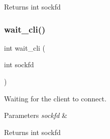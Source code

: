 \begin{DoxyReturn}{Returns}
int sockfd 
\end{DoxyReturn}
\mbox{\label{socket_8h_aa1bc7f68e6545e809e6b75b737fcbbe3}} 
\subsubsection{wait\+\_\+cli()}
{\footnotesize\ttfamily int wait\+\_\+cli (\begin{DoxyParamCaption}\item[{int}]{sockfd }\end{DoxyParamCaption})}



Waiting for the client to connect. 


\begin{DoxyParams}{Parameters}
{\em sockfd} & \\
\hline
\end{DoxyParams}
\begin{DoxyReturn}{Returns}
int sockfd 
\end{DoxyReturn}
